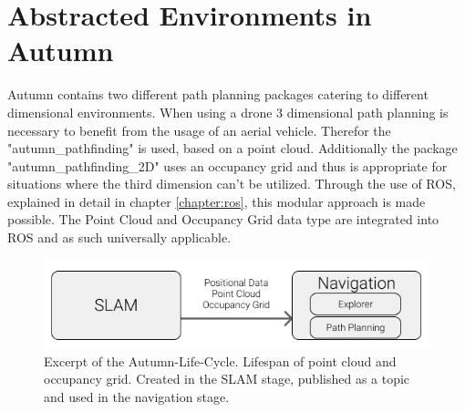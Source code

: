 \section{Abstracted Environments in Autumn}
Autumn contains two different path planning packages catering to different dimensional environments. When using a drone 3 dimensional path planning is necessary to benefit from the usage of an aerial vehicle. Therefor the "autumn\_pathfinding" is used, based on a point cloud. Additionally the package "autumn\_pathfinding\_2D" uses an occupancy grid and thus is appropriate for situations where the third dimension can't be utilized.\newline
Through the use of ROS, explained in detail in chapter \ref{chapter:ros}, this modular approach is made possible. The Point Cloud and Occupancy Grid data type are integrated into ROS and as such universally applicable.   

\begin{figure}[h]
	\centering
	\includegraphics[width=0.8\linewidth]{img/EnvironmentTransfer}
	\caption{Excerpt of the Autumn-Life-Cycle. Lifespan of point cloud and occupancy grid. Created in the SLAM stage, published as a topic and used in the navigation stage.}
	\label{fig:abstract_environments_enviromentTransfer}
\end{figure}


